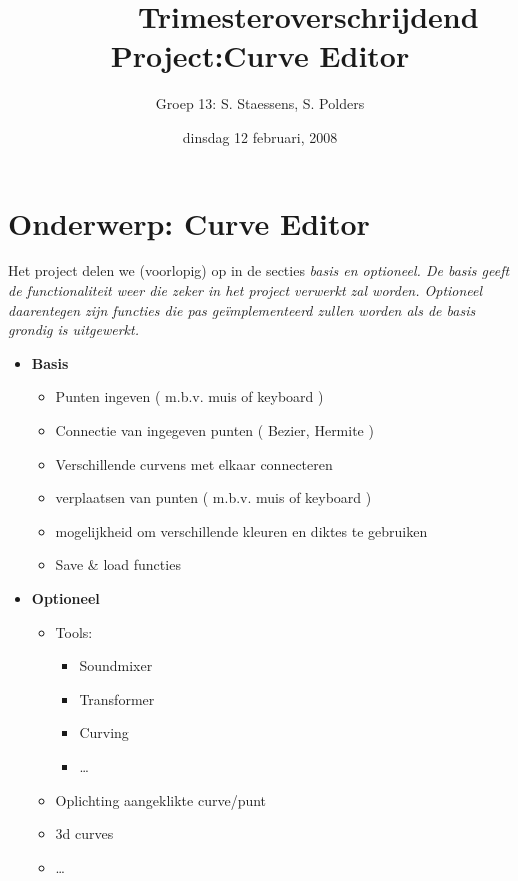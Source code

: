 \documentclass[a4paper,11pt,oneside, titlepage]{article}
\author{ Groep 13: S. Staessens, S. Polders }
\title{\ \ \ \ \ \ Trimesteroverschrijdend Project:\newline Curve Editor}
\date{dinsdag 12 februari, 2008}
\begin{document}
\maketitle\newpage
\section{Onderwerp: Curve Editor}
Het project delen we (voorlopig) op in de secties \it{basis} en \it{optioneel}. 
\rm{De basis geeft de functionaliteit weer die zeker in het project verwerkt zal worden. Optioneel
daarentegen zijn functies die pas ge\"implementeerd zullen worden als de basis grondig is 
uitgewerkt.}
\begin{itemize}
\item \bf Basis
\begin{itemize}
\item Punten ingeven ( m.b.v. muis of keyboard )
\item Connectie van ingegeven punten ( Bezier, Hermite )
\item Verschillende curvens met elkaar connecteren
\item verplaatsen van punten ( m.b.v. muis of keyboard )
\item mogelijkheid om verschillende kleuren en diktes te gebruiken
\item Save \& load functies
\end{itemize}
\item \bf Optioneel
\begin{itemize}
\item Tools:
\begin{itemize}
\item Soundmixer
\item Transformer
\item Curving
\item \ldots
\end{itemize}
\item Oplichting aangeklikte curve/punt
\item 3d curves
\item \ldots
\end{itemize}
\end{itemize}
\end{document}
